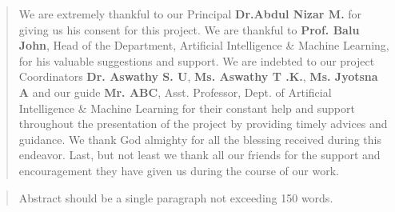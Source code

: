 \documentclass[12pt,a4paper,titlepage]{report}
\begin{document}



\clearpage
\normalsize{}
\thispagestyle{empty}
\renewcommand\abstractname{ACKNOWLEDGEMENT}
\begin{abstract}
\vspace{1.5cm}
We are extremely thankful to our Principal \textbf{Dr.Abdul Nizar M. } 
for giving us his consent for this project. We are thankful to 
\textbf{Prof. Balu John}, Head of the Department, Artificial Intelligence \& Machine Learning, for his valuable suggestions and
support. We are indebted to our project Coordinators \textbf{Dr. Aswathy S. U}, \textbf{Ms. Aswathy T .K.}, \textbf{Ms. Jyotsna A} and our guide \textbf{Mr. ABC},
Asst. Professor, Dept. of Artificial Intelligence \& Machine Learning  for their constant help and support throughout the presentation of the project by providing timely advices and guidance. We thank God almighty for all
the blessing received during this endeavor. Last, but not least we thank all our
friends for the support and encouragement they have given us during the course of our work.

\end{abstract}


\newpage
\renewcommand\abstractname {ABSTRACT}
\begin{abstract}
\vspace{1.5cm}

Abstract should be a single paragraph not exceeding 150 words.

\end{abstract}



\newpage
{}
\normalsize \tableofcontents

\newpage
\normalsize \listoffigures

\newpage
\normalsize \listoftables



\newpage
{}
\setcounter{page}{1}

\pagestyle{fancy}
\fancyhead{}
\fancyfoot{}
\fancyfoot[C] {\thepage}
\renewcommand{\headrulewidth}{0.4pt}
\renewcommand{\footrulewidth}{0.4pt}
\end{document}
